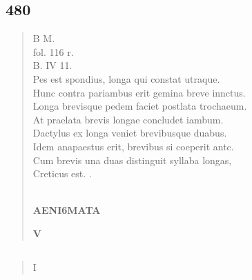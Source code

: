 \documentclass[11pt, a4paper]{report}
\begin{document}
            \subsection*{480}
      \begin{verse}
      B M. \\ fol. 116 r. \\ B. IV 11. \\ Pes est spondius, longa qui constat utraque. \\ Hunc contra pariambus erit gemina breve innctus. \\ Longa brevisque pedem faciet postlata trochaeum. \\ At praelata brevis longae concludet iambum. \\ Dactylus ex longa veniet brevibusque duabus. \\ Idem anapaestus erit, brevibus si coeperit antc. \\ Cum brevis una duas distinguit syllaba longas, \\ Creticus est. . \\ 
        ﻿\pagebreak 
    \begin{center} \textbf{AENI6MATA} \end{center}\begin{center} \textbf{V} \end{center}
      \end{verse}
  
            \subsection*{}
      \begin{verse}
      I \\ 
      \end{verse}
  
\end{document}

